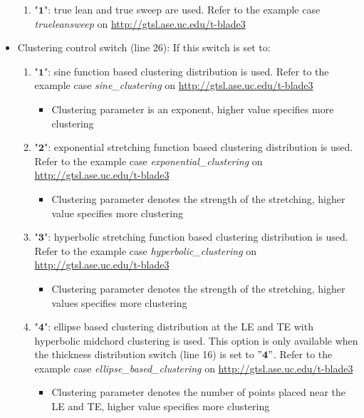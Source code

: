 \documentclass[8pt]{article}
\begin{document}
\begin{itemize}[leftmargin=*]
\begin{enumerate}[label=\alph*]
        \item "$\mathbf{1}$": true lean and true sweep are used. Refer to the example case \textit{trueleansweep} on \url{http://gtsl.ase.uc.edu/t-blade3}
    \end{enumerate}
    \item Clustering control switch (line 26): If this switch is set to:
    \begin{enumerate}[label=\alph*]
        \item "$\mathbf{1}$": sine function based clustering distribution is used. Refer to the example case \textit{sine\_clustering} on \url{http://gtsl.ase.uc.edu/t-blade3}
        \begin{itemize}[label=\FilledSmallSquare]
            \item Clustering parameter is an exponent, higher value specifies more clustering
        \end{itemize}
        \item "$\mathbf{2}$": exponential stretching function based clustering distribution is used. Refer to the example case \textit{exponential\_clustering} on \url{http://gtsl.ase.uc.edu/t-blade3}
        \begin{itemize}[label=\FilledSmallSquare]
            \item Clustering parameter denotes the strength of the stretching, higher value specifies more clustering
        \end{itemize}
        \item "$\mathbf{3}$": hyperbolic stretching function based clustering distribution is used. Refer to the example case \textit{hyperbolic\_clustering} on \url{http://gtsl.ase.uc.edu/t-blade3}
        \begin{itemize}[label=\FilledSmallSquare]
            \item Clustering parameter denotes the strength of the stretching, higher values specifies more clustering
        \end{itemize}
        \item "$\mathbf{4}$": ellipse based clustering distribution at the LE and TE with hyperbolic midchord clustering is used. This option is only available when the thickness distribution switch (line 16) is set to $"\mathbf{4}"$. Refer to the example case \textit{ellipse\_based\_clustering} on \url{http://gtsl.ase.uc.edu/t-blade3}
        \begin{itemize}[label=\FilledSmallSquare]
            \item Clustering parameter denotes the number of points placed near the LE and TE, higher value specifies more clustering

\end{itemize}
\end{enumerate}
\end{itemize}
\end{document}
